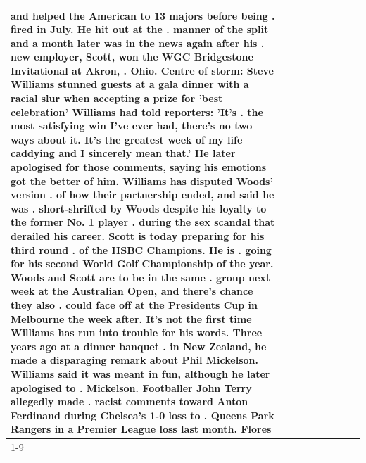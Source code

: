 \begin{table}[H]
\begin{tabular}{lllrlllll}
and helped the American to 13 majors before being . fired in July. He hit out at the . manner of the split and a month later was in the news again after his . new employer, Scott, won the WGC Bridgestone Invitational at Akron, . Ohio. Centre of storm: Steve Williams stunned guests at a gala dinner with a racial slur when accepting a prize for 'best celebration' Williams had told reporters: 'It's . the most satisfying win I've ever had, there's no two ways about it. It's the greatest week of my life caddying and I sincerely mean that.' He later apologised for those comments, saying his emotions got the better of him. Williams has disputed Woods' version . of how their partnership ended, and said he was . short-shrifted by Woods despite his loyalty to the former No. 1 player . during the sex scandal that derailed his career. Scott is today preparing for his third round . of the HSBC Champions. He is . going for his second World Golf Championship of the year. Woods and Scott are to be in the same . group next week at the Australian Open, and there's chance they also . could face off at the Presidents Cup in Melbourne the week after. It's not the first time Williams has run into trouble for his words. Three years ago at a dinner banquet . in New Zealand, he made a disparaging remark about Phil Mickelson. Williams said it was meant in fun, although he later apologised to . Mickelson. Footballer John Terry allegedly made . racist comments toward Anton Ferdinand during Chelsea's 1-0 loss to . Queens Park Rangers in a Premier League loss last month. Flores \\
\cline{1-9}

\end{tabular}
\end{table}
